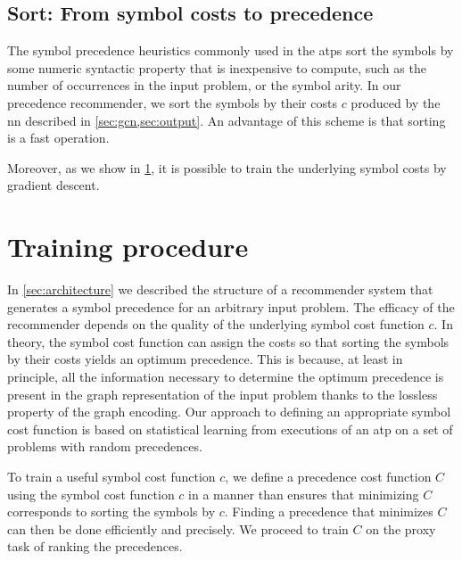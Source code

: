 \subsection{Sort: From symbol costs to precedence}
\label{sec:sorting}

The symbol precedence heuristics commonly used in the \glspl{atp} sort the symbols by some numeric syntactic property
that is inexpensive to compute,
such as the number of occurrences in the input problem, or the symbol arity.
In our precedence recommender,
we sort the symbols by their costs $c$ produced by the \acrlong{nn} described in \cref{sec:gcn,sec:output}.
An advantage of this scheme is that sorting is a fast operation.

Moreover, as we show in \cref{sec:training}, it is possible
to train the underlying symbol costs by gradient descent.


\section{Training procedure}
\label{sec:training}

In \cref{sec:architecture} we described the structure of a recommender system that generates a symbol precedence for an arbitrary input problem.
The efficacy of the recommender depends on the quality of the underlying symbol cost function $c$.
In theory, the symbol cost function can assign the costs so that
sorting the symbols by their costs yields an optimum precedence.
This is because, at least in principle, all the information necessary 
to determine the optimum precedence is present in the graph representation of the input problem
thanks to the lossless property of the graph encoding.
Our approach to defining an appropriate symbol cost function is based on statistical learning
from executions of an \gls{atp} on a set of problems with random precedences.

To train a useful symbol cost function $c$,
we define a precedence cost function $C$ using the symbol cost function $c$
in a manner than ensures that minimizing $C$ corresponds to sorting the symbols by $c$.
Finding a precedence that minimizes $C$ can then be done efficiently and precisely.
We proceed to train $C$ on the proxy task of ranking the precedences.

